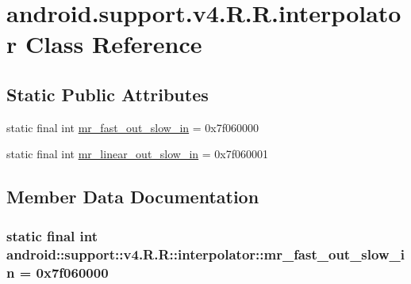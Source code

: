 \hypertarget{classandroid_1_1support_1_1v4_1_1_r_1_1interpolator}{
\section{android.support.v4.R.R.interpolator Class Reference}
\label{classandroid_1_1support_1_1v4_1_1_r_1_1interpolator}
}
\subsection*{Static Public Attributes}
\begin{CompactItemize}
\item 
static final int \hyperlink{classandroid_1_1support_1_1v4_1_1_r_1_1interpolator_ec3c1f528268855e7de90c29bc5afdc1}{mr\_\-fast\_\-out\_\-slow\_\-in} = 0x7f060000
\item 
static final int \hyperlink{classandroid_1_1support_1_1v4_1_1_r_1_1interpolator_fd2cd1174e3b364e3d829766ca3884b6}{mr\_\-linear\_\-out\_\-slow\_\-in} = 0x7f060001
\end{CompactItemize}


\subsection{Member Data Documentation}
\hypertarget{classandroid_1_1support_1_1v4_1_1_r_1_1interpolator_ec3c1f528268855e7de90c29bc5afdc1}{
\subsubsection[{mr\_\-fast\_\-out\_\-slow\_\-in}]{\setlength{\rightskip}{0pt plus 5cm}static final int android::support::v4.R.R::interpolator::mr\_\-fast\_\-out\_\-slow\_\-in = 0x7f060000}}
\label{classandroid_1_1support_1_1v4_1_1_r_1_1interpolator_ec3c1f528268855e7de90c29bc5afdc1}


